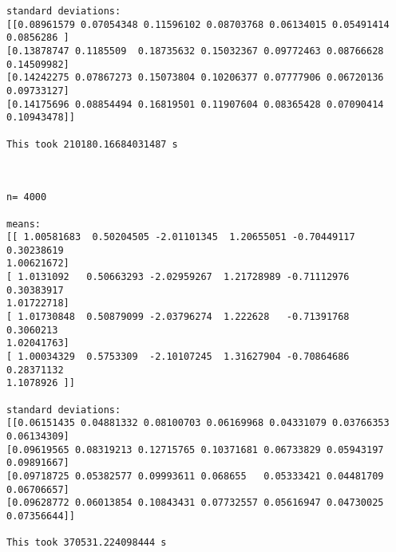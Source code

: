 \documentclass{article}
\theoremstyle{definition}
\theoremstyle{remark}
\begin{document}
\begin{verbatim}
standard deviations: 
[[0.08961579 0.07054348 0.11596102 0.08703768 0.06134015 0.05491414
0.0856286 ]
[0.13878747 0.1185509  0.18735632 0.15032367 0.09772463 0.08766628
0.14509982]
[0.14242275 0.07867273 0.15073804 0.10206377 0.07777906 0.06720136
0.09733127]
[0.14175696 0.08854494 0.16819501 0.11907604 0.08365428 0.07090414
0.10943478]]

This took 210180.16684031487 s



n= 4000

means: 
[[ 1.00581683  0.50204505 -2.01101345  1.20655051 -0.70449117  0.30238619
1.00621672]
[ 1.0131092   0.50663293 -2.02959267  1.21728989 -0.71112976  0.30383917
1.01722718]
[ 1.01730848  0.50879099 -2.03796274  1.222628   -0.71391768  0.3060213
1.02041763]
[ 1.00034329  0.5753309  -2.10107245  1.31627904 -0.70864686  0.28371132
1.1078926 ]]

standard deviations: 
[[0.06151435 0.04881332 0.08100703 0.06169968 0.04331079 0.03766353
0.06134309]
[0.09619565 0.08319213 0.12715765 0.10371681 0.06733829 0.05943197
0.09891667]
[0.09718725 0.05382577 0.09993611 0.068655   0.05333421 0.04481709
0.06706657]
[0.09628772 0.06013854 0.10843431 0.07732557 0.05616947 0.04730025
0.07356644]]

This took 370531.224098444 s
\end{verbatim}
\end{document}
